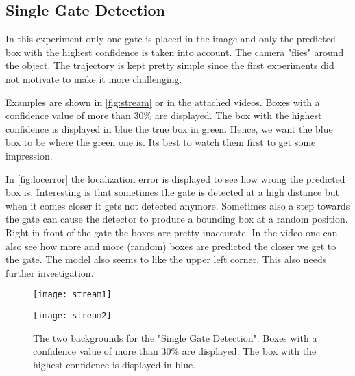 \documentclass{article}
\begin{document}
\subsection{Single Gate Detection} 
In this experiment only one gate is placed in the image and only the predicted box with the highest confidence is taken into account. The camera "flies" around the object. The trajectory is kept pretty simple since the first experiments did not motivate to make it more challenging.

Examples are shown in \autoref{fig:stream} or in the attached videos. Boxes with a confidence value of more than 30\% are displayed. The box with the highest confidence is displayed in blue the true box in green. Hence, we want the blue box to be where the green one is. Its best to watch them first to get some impression.

In \autoref{fig:locerror} the localization error is displayed to see how wrong the predicted box is. Interesting is that sometimes the gate is detected at a high distance but when it comes closer it gets not detected anymore. Sometimes also a step towards the gate can cause the detector to produce a bounding box at a random position. Right in front of the gate the boxes are pretty inaccurate. In the video one can also see how more and more (random) boxes are predicted the closer we get to the gate. The model also seems to like the upper left corner. This also needs further investigation.

\begin{figure}[h]
	\centering
	\begin{minipage}{0.25\textwidth}
		\centering
		\texttt{[image: stream1]}
			
	\end{minipage}
	\begin{minipage}{0.25\textwidth}
		\centering
		\texttt{[image: stream2]}
	\end{minipage}
	\caption{The two backgrounds for the "Single Gate Detection". Boxes with a confidence value of more than 30\% are displayed. The box with the highest confidence is displayed in blue.}
	\label{fig:stream}
\end{figure}
\end{document}
